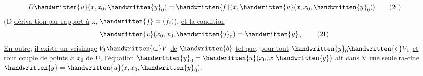 \[
D\handwritten{u}(x,x_0,\handwritten{y}_0)=\handwritten{f}(x,\handwritten{u}(x,x_0,\handwritten{y}_0))
\tag*{(20)}
\]
(D \uline{dériva tion par rapport à} x, $\handwritten{f}=(f_i)$), \uline{et la condition}
\[
\handwritten{u}(x_0,x_0,\handwritten{y}_0)=\handwritten{y}_0.
\tag*{(21)}
\]
\uline{En outre}, \uline{il existe un voisinage} $V_1\handwritten{\subset}V$ \uline{de} $\handwritten{b}$ \uline{tel que}, \uline{pour tout} $\handwritten{y}_0\handwritten{\in}V_1$ \uline{et tout couple de points} $x,x_0$ \uline{de} U, \uline{l'équation} $\handwritten{y}_0=\handwritten{u}(x_0,x,\handwritten{y})$ \uline{ait dans} V \uline{une seule ra-cine} $\handwritten{y}=\handwritten{u}(x,x_0,\handwritten{y}_0)$.

